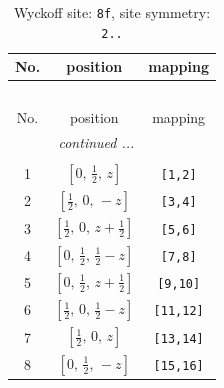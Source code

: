 \documentclass[fleqn,8pt]{jsarticle}
\begin{document}
\begin{longtable}{ccc}
\caption{Wyckoff site: {\tt 8f}, site symmetry: {\tt 2..}}
 \\
 \hline \hline
No. & position & mapping \\ \hline \endfirsthead

\multicolumn{2}{l}{\tablename\ \thetable{}} \\
 \hline \hline
No. & position & mapping \\ \hline \endhead

 \hline \hline
\multicolumn{2}{r}{\footnotesize\it continued ...} \\ \endfoot

 \hline \hline
\multicolumn{2}{r}{} \\ \endlastfoot

1 & $\left[ 0,\, \frac{1}{2},\, z \right]$ & {\tt [1,2]} \\ \hline
2 & $\left[ \frac{1}{2},\, 0,\, - z \right]$ & {\tt [3,4]} \\ \hline
3 & $\left[ \frac{1}{2},\, 0,\, z + \frac{1}{2} \right]$ & {\tt [5,6]} \\ \hline
4 & $\left[ 0,\, \frac{1}{2},\, \frac{1}{2} - z \right]$ & {\tt [7,8]} \\ \hline
5 & $\left[ 0,\, \frac{1}{2},\, z + \frac{1}{2} \right]$ & {\tt [9,10]} \\ \hline
6 & $\left[ \frac{1}{2},\, 0,\, \frac{1}{2} - z \right]$ & {\tt [11,12]} \\ \hline
7 & $\left[ \frac{1}{2},\, 0,\, z \right]$ & {\tt [13,14]} \\ \hline
8 & $\left[ 0,\, \frac{1}{2},\, - z \right]$ & {\tt [15,16]} \\
\end{longtable}
\renewcommand{\arraystretch}{1.2}
\end{document}
